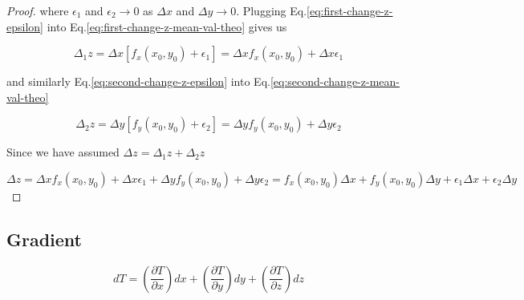 \begin{proof}
    where $\epsilon_1$ and $\epsilon_2 \rightarrow 0$ as $\Delta x$ and $\Delta y \rightarrow 0$. Plugging
    Eq.\ref{eq:first-change-z-epsilon} into Eq.\ref{eq:first-change-z-mean-val-theo} gives us

    \begin{equation}
        \Delta_1 z = \Delta x\left[ f_x(x_0, y_0) + \epsilon_1 \right] = \Delta x f_x(x_0, y_0) + \Delta x\epsilon_1
    \end{equation}

    and similarly Eq.\ref{eq:second-change-z-epsilon} into Eq.\ref{eq:second-change-z-mean-val-theo}

    \begin{equation}
        \Delta_2 z = \Delta y\left[ f_y(x_0, y_0) + \epsilon_2 \right] = \Delta y f_y(x_0, y_0) + \Delta y\epsilon_2
    \end{equation}

    Since we have assumed $\Delta z = \Delta_1 z + \Delta_2 z$

    \begin{equation}
        \Delta z = \Delta x f_x(x_0, y_0) + \Delta x\epsilon_1 + \Delta y f_y(x_0, y_0) + \Delta y\epsilon_2 = f_x(x_0, y_0)\Delta x + f_y(x_0, y_0)\Delta y + \epsilon_1\Delta x + \epsilon_2\Delta y
    \end{equation}
\end{proof}

\subsection{Gradient}

\begin{equation}
    dT = \left( \frac{\partial T}{\partial x} \right) dx + \left( \frac{\partial T}{\partial y} \right) dy + \left( \frac{\partial T}{\partial z} \right) dz
\end{equation}